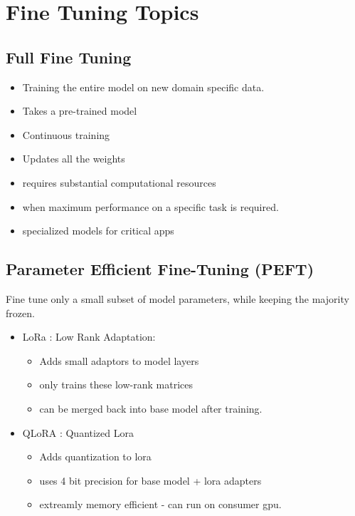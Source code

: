 \documentclass[10pt,a4paper]{article}
\begin{document}
\section{Fine Tuning Topics}\label{fine-tuning-topics}

\subsection{Full Fine Tuning}
  \begin{itemize}
  \item
    Training the entire model on new domain specific data.
  \item
    Takes a pre-trained model
  \item
    Continuous training
  \item
    Updates all the weights
  \item
    requires substantial computational resources
  \item
    when maximum performance on a specific task is required.
  \item
    specialized models for critical apps
\end{itemize}

\subsection{Parameter Efficient Fine-Tuning (PEFT)}
Fine tune only a small subset of model parameters, while keeping the majority frozen.
\begin{itemize}
  \item LoRa : Low Rank Adaptation:
    \begin{itemize}
    \item
      Adds small adaptors to model layers
    \item
      only trains these low-rank matrices
    \item
      can be merged back into base model after training.
    \end{itemize}
  \item QLoRA : Quantized Lora

    \begin{itemize}
    
    \item
      Adds quantization to lora
    \item
      uses 4 bit precision for base model + lora adapters
    \item
      extreamly memory efficient - can run on consumer gpu.
    \end{itemize}
\end{itemize}
\end{document}
